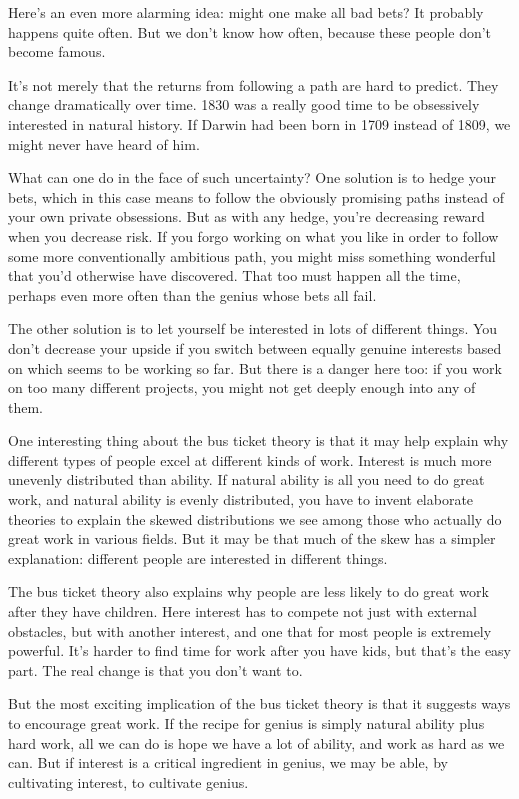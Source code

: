 \documentclass[12pt]{book}
\begin{document}
Here's an even more alarming idea: might one make all bad bets? It
probably happens quite often. But we don't know how often, because these
people don't become famous.

It's not merely that the returns from following a path are hard to
predict. They change dramatically over time. 1830 was a really good time
to be obsessively interested in natural history. If Darwin had been born
in 1709 instead of 1809, we might never have heard of him.

What can one do in the face of such uncertainty? One solution is to
hedge your bets, which in this case means to follow the obviously
promising paths instead of your own private obsessions. But as with any
hedge, you're decreasing reward when you decrease risk. If you forgo
working on what you like in order to follow some more conventionally
ambitious path, you might miss something wonderful that you'd otherwise
have discovered. That too must happen all the time, perhaps even more
often than the genius whose bets all fail.

The other solution is to let yourself be interested in lots of different
things. You don't decrease your upside if you switch between equally
genuine interests based on which seems to be working so far. But there
is a danger here too: if you work on too many different projects, you
might not get deeply enough into any of them.

One interesting thing about the bus ticket theory is that it may help
explain why different types of people excel at different kinds of work.
Interest is much more unevenly distributed than ability. If natural
ability is all you need to do great work, and natural ability is evenly
distributed, you have to invent elaborate theories to explain the skewed
distributions we see among those who actually do great work in various
fields. But it may be that much of the skew has a simpler explanation:
different people are interested in different things.

The bus ticket theory also explains why people are less likely to do
great work after they have children. Here interest has to compete not
just with external obstacles, but with another interest, and one that
for most people is extremely powerful. It's harder to find time for work
after you have kids, but that's the easy part. The real change is that
you don't want to.

But the most exciting implication of the bus ticket theory is that it
suggests ways to encourage great work. If the recipe for genius is
simply natural ability plus hard work, all we can do is hope we have a
lot of ability, and work as hard as we can. But if interest is a
critical ingredient in genius, we may be able, by cultivating interest,
to cultivate genius.
\end{document}

